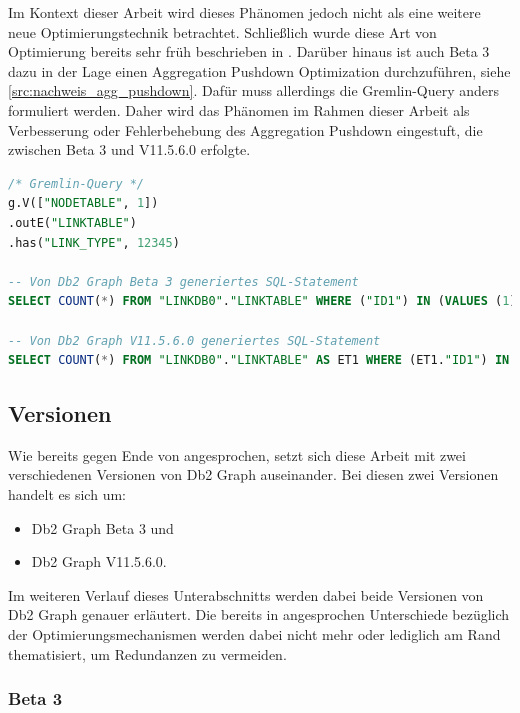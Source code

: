 \begin{itemize}
    Im Kontext dieser Arbeit wird dieses Phänomen jedoch nicht als eine weitere neue Optimierungstechnik betrachtet. Schließlich wurde diese Art von Optimierung bereits sehr früh beschrieben in \cite{sigmod_tian}. Darüber hinaus ist auch Beta 3 dazu in der Lage einen Aggregation Pushdown Optimization durchzuführen, siehe \autoref{src:nachweis_agg_pushdown}. Dafür muss allerdings die Gremlin-Query anders formuliert werden. Daher wird das Phänomen im Rahmen dieser Arbeit als Verbesserung oder Fehlerbehebung des Aggregation Pushdown eingestuft, die zwischen Beta 3 und V11.5.6.0 erfolgte.

\begin{lstlisting}[label=src:nachweis_agg_pushdown,caption={Nachweis für Aggregation Pushdown in Db2 Graph Beta 3},language=SQL]
/* Gremlin-Query */
g.V(["NODETABLE", 1])
.outE("LINKTABLE")
.has("LINK_TYPE", 12345)

-- Von Db2 Graph Beta 3 generiertes SQL-Statement
SELECT COUNT(*) FROM "LINKDB0"."LINKTABLE" WHERE ("ID1") IN (VALUES (1)) AND "LINK_TYPE" = 12345;

-- Von Db2 Graph V11.5.6.0 generiertes SQL-Statement
SELECT COUNT(*) FROM "LINKDB0"."LINKTABLE" AS ET1 WHERE (ET1."ID1") IN (VALUES (1)) AND ET1."LINK_TYPE" = 12345;
\end{lstlisting}
\end{itemize}

\subsection{Versionen}

Wie bereits gegen Ende von  angesprochen, setzt sich diese Arbeit mit zwei verschiedenen Versionen von Db2 Graph auseinander. Bei diesen zwei Versionen handelt es sich um: 

\begin{itemize}
    \item Db2 Graph Beta 3 und
    \item Db2 Graph V11.5.6.0.
\end{itemize}

Im weiteren Verlauf dieses Unterabschnitts werden dabei beide Versionen von Db2 Graph genauer erläutert. Die bereits in  angesprochen Unterschiede bezüglich der Optimierungsmechanismen werden dabei nicht mehr oder lediglich am Rand thematisiert, um Redundanzen zu vermeiden. 

\subsubsection{Beta 3}

